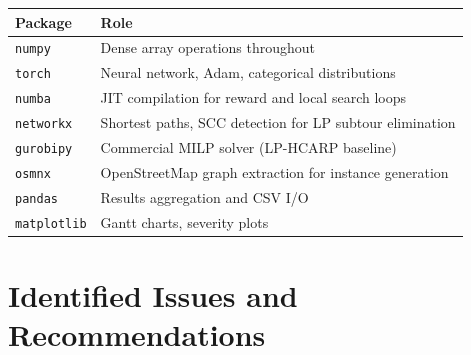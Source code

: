 \documentclass[11pt,a4paper]{article}
\begin{document}
\begin{center}
\begin{tabular}{ll}
\toprule
\textbf{Package} & \textbf{Role} \\
\midrule
\texttt{numpy}      & Dense array operations throughout \\
\texttt{torch}      & Neural network, Adam, categorical distributions \\
\texttt{numba}      & JIT compilation for reward and local search loops \\
\texttt{networkx}   & Shortest paths, SCC detection for LP subtour elimination \\
\texttt{gurobipy}   & Commercial MILP solver (LP-HCARP baseline) \\
\texttt{osmnx}      & OpenStreetMap graph extraction for instance generation \\
\texttt{pandas}     & Results aggregation and CSV I/O \\
\texttt{matplotlib} & Gantt charts, severity plots \\
\bottomrule
\end{tabular}
\end{center}

\section{Identified Issues and Recommendations}
\end{document}
